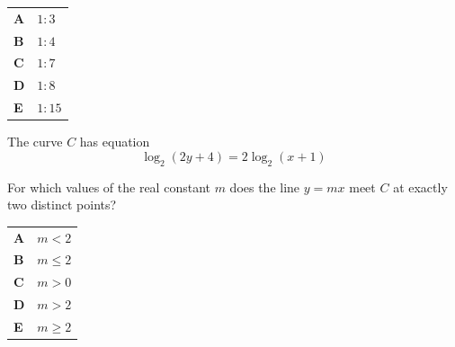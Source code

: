 \documentclass[11pt,a4paper]{article}
\begin{document}
\begin{enumerate}[label=\textbf{\arabic*.},leftmargin=*,itemsep=0pt,start=18]
\par\vspace*{12pt}
\begin{tabularx}{\linewidth}{@{}>{\bfseries}l Y@{}}
A &
$1 : 3$
\\[0.8em]
B &
$1 : 4$
\\[0.8em]
C &
$1 : 7$
\\[0.8em]
D &
$1 : 8$
\\[0.8em]
E &
$1 : 15$
\\
\end{tabularx}
\end{enumerate}
\clearpage
\thispagestyle{djspaper}
\vspace*{8pt}
\begin{enumerate}[label=\textbf{\arabic*.},leftmargin=*,itemsep=0pt,start=19]
The curve $C$ has equation
\[\log_2(2y+4)=2\log_2(x+1)\]

For which values of the real constant $m$ does the line $y=mx$ meet $C$ at exactly two distinct points?

\par\vspace*{12pt}
\begin{tabularx}{\linewidth}{@{}>{\bfseries}l Y@{}}
A &
$m<2$
\\[0.8em]
B &
$m\le 2$
\\[0.8em]
C &
$m>0$
\\[0.8em]
D &
$m>2$
\\[0.8em]
E &
$m\ge 2$
\\
\end{tabularx}
\end{enumerate}
\clearpage
\thispagestyle{djspaper}
\vspace*{8pt}
\end{document}
